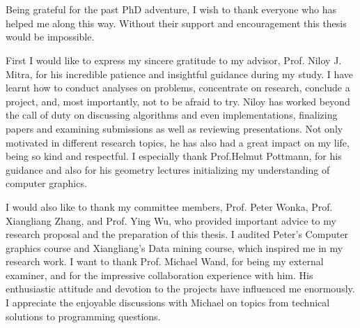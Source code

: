 

\chapter*{}



Being grateful for the past PhD adventure, I wish to thank everyone who has helped me along this way. Without their support and encouragement this thesis would be impossible.

First I would like to express my sincere gratitude to my advisor, Prof. Niloy J. Mitra, for his incredible patience and insightful guidance during my study. I have learnt how to conduct analyses on problems, concentrate on research, conclude a project, and, most importantly, not to be afraid to try. Niloy has worked beyond the call of duty on discussing algorithms and even implementations, finalizing papers and examining submissions as well as reviewing presentations. Not only motivated in different research topics, he has also had a great impact on my life, being so kind and respectful. I especially thank Prof.Helmut Pottmann, for his guidance and also for his geometry lectures initializing my understanding of computer graphics.

I would also like to thank my committee members, Prof. Peter Wonka, Prof. Xiangliang Zhang, and Prof. Ying Wu, who provided important advice to my research proposal and the preparation of this thesis. I audited Peter's Computer graphics course and Xiangliang's Data mining course, which inspired me in my research work. I want to thank Prof. Michael Wand, for being my external examiner, and for the impressive collaboration experience with him. His enthusiastic attitude and devotion to the projects have influenced me enormously. I appreciate the enjoyable discussions with Michael on topics from technical solutions to programming questions.

